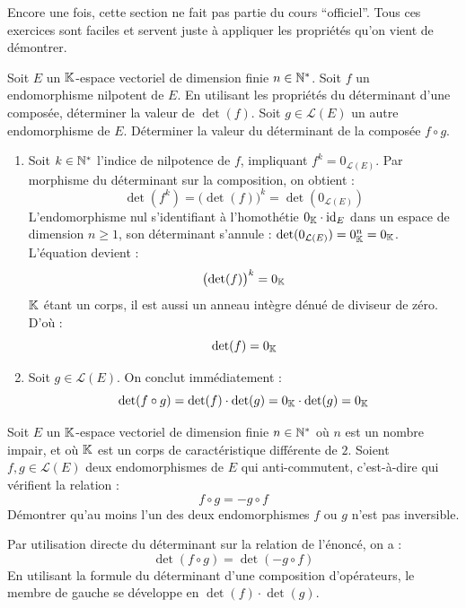 \documentclass[12pt, a4paper]{report}
\begin{document}
Encore une fois, cette section ne fait pas partie du cours ``officiel''. Tous ces exercices sont faciles et servent juste à appliquer les propriétés qu'on vient de démontrer.

\begin{exercise}
    Soit $E$ un $\mathbb{K}$-espace vectoriel de dimension finie $n \in \mathbb{N}^*$. Soit $f$ un endomorphisme nilpotent de $E$. En utilisant les propriétés du déterminant d'une composée, déterminer la valeur de $\det(f)$. Soit $g \in \mathcal{L}(E)$ un autre endomorphisme de $E$. Déterminer la valeur du déterminant de la composée $f \circ g$.
\end{exercise}

\begin{enumerate}
    \item Soit $k \in \mathbb{N}^*$ l'indice de nilpotence de $f$, impliquant $f^k = 0_{\mathcal{L}(E)}$. Par morphisme du déterminant sur la composition, on obtient :
    $$\det(f^k) = \bigl(\det(f)\bigr)^k = \det(0_{\mathcal{L}(E)})$$
    L'endomorphisme nul s'identifiant à l'homothétie $0_{\mathbb{K}} \cdot \mathrm{id}_E$ dans un espace de dimension $n \ge 1$, son déterminant s'annule : $\det(0_{\mathcal{L}(E)}) = 0_{\mathbb{K}}^n = 0_{\mathbb{K}}$. L'équation devient :
    $$\bigl(\det(f)\bigr)^k = 0_{\mathbb{K}}$$
    $\mathbb{K}$ étant un corps, il est aussi un anneau intègre dénué de diviseur de zéro. D'où :
    $$\det(f) = 0_{\mathbb{K}}$$

    \item Soit $g \in \mathcal{L}(E)$. On conclut immédiatement :
    $$\det(f \circ g) = \det(f) \cdot \det(g) = 0_{\mathbb{K}} \cdot \det(g) = 0_{\mathbb{K}}$$
\end{enumerate}

\begin{exercise}
    Soit $E$ un $\mathbb{K}$-espace vectoriel de dimension finie $n \in \mathbb{N}^*$ où $n$ est un nombre impair, et où $\mathbb{K}$ est un corps de caractéristique différente de $2$. Soient $f, g \in \mathcal{L}(E)$ deux endomorphismes de $E$ qui anti-commutent, c'est-à-dire qui vérifient la relation :
    $$f \circ g = -g \circ f$$
    Démontrer qu'au moins l'un des deux endomorphismes $f$ ou $g$ n'est pas inversible.
\end{exercise}

Par utilisation directe du déterminant sur la relation de l'énoncé, on a :
$$\det(f \circ g) = \det(-g \circ f)$$
En utilisant la formule du déterminant d'une composition d'opérateurs, le membre de gauche se développe en $\det(f) \cdot \det(g)$. 
\end{document}

